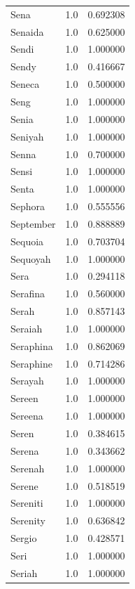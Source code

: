 \documentclass[
  letterpaper,
  DIV=11,
  numbers=noendperiod]{scrreprt}
\begin{document}
\begin{tabular}{lrr}
Sena            &   1.0 &   0.692308 \\
Senaida         &   1.0 &   0.625000 \\
Sendi           &   1.0 &   1.000000 \\
Sendy           &   1.0 &   0.416667 \\
Seneca          &   1.0 &   0.500000 \\
Seng            &   1.0 &   1.000000 \\
Senia           &   1.0 &   1.000000 \\
Seniyah         &   1.0 &   1.000000 \\
Senna           &   1.0 &   0.700000 \\
Sensi           &   1.0 &   1.000000 \\
Senta           &   1.0 &   1.000000 \\
Sephora         &   1.0 &   0.555556 \\
September       &   1.0 &   0.888889 \\
Sequoia         &   1.0 &   0.703704 \\
Sequoyah        &   1.0 &   1.000000 \\
Sera            &   1.0 &   0.294118 \\
Serafina        &   1.0 &   0.560000 \\
Serah           &   1.0 &   0.857143 \\
Seraiah         &   1.0 &   1.000000 \\
Seraphina       &   1.0 &   0.862069 \\
Seraphine       &   1.0 &   0.714286 \\
Serayah         &   1.0 &   1.000000 \\
Sereen          &   1.0 &   1.000000 \\
Sereena         &   1.0 &   1.000000 \\
Seren           &   1.0 &   0.384615 \\
Serena          &   1.0 &   0.343662 \\
Serenah         &   1.0 &   1.000000 \\
Serene          &   1.0 &   0.518519 \\
Sereniti        &   1.0 &   1.000000 \\
Serenity        &   1.0 &   0.636842 \\
Sergio          &   1.0 &   0.428571 \\
Seri            &   1.0 &   1.000000 \\
Seriah          &   1.0 &   1.000000 \\

\end{tabular}
\end{document}
